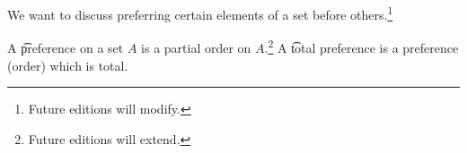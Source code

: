 

We want to discuss preferring certain elements of a set before others.\footnote{Future editions will modify.}


A \t{preference} on a set $A$ is a partial order on $A$.\footnote{Future editions will extend.}
A \t{total preference} is a preference (order) which is total.


\blankpage
